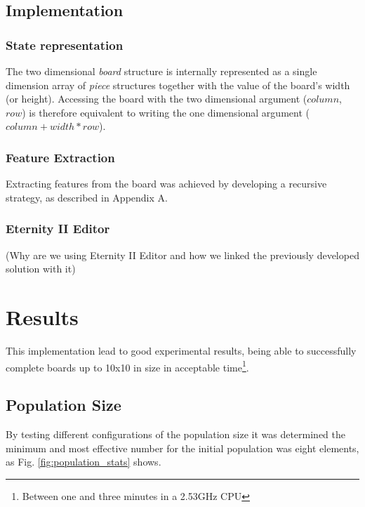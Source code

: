 \documentclass{llncs}
\begin{document}
\subsection{Implementation}\label{sec:implementation}

\subsubsection{State representation}\label{sec:state_representation}

The two dimensional \textit{board} structure is internally represented as a single dimension array of \textit{piece} structures together with the value of the board's width (or height). Accessing the board with the two dimensional argument ($column$, $row$) is therefore equivalent to writing the one dimensional argument ($column + width * row$).


\subsubsection{Feature Extraction}\label{sec:feature_extraction}

Extracting features from the board was achieved by developing a recursive strategy, as described in Appendix A.%

\subsubsection{Eternity II Editor}\label{sec:eternity2_editor}

(Why are we using Eternity II Editor and how we linked the previously developed solution with it)

\section{Results}\label{sec:results}

This implementation lead to good experimental results, being able to successfully complete boards up to 10x10 in size in acceptable time\footnote{Between one and three minutes in a 2.53GHz CPU}.

\subsection{Population Size}\label{sec:population_size}

By testing different configurations of the population size it was determined the minimum and most effective number for the initial population was eight elements, as Fig. \ref{fig:population_stats} shows.
\end{document}
